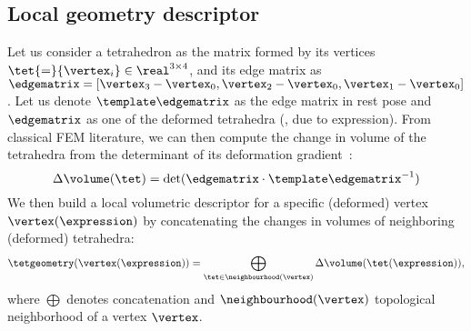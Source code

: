   \subsection{Local geometry descriptor}
    \label{sec:blendfields-similarity}
    Let us consider a tetrahedron as the matrix formed by its vertices~$\tet
    {=} \{\vertex_i\} \in \real^{3 \times 4}$, and its edge matrix as
    $\edgematrix = [\vertex_3-\vertex_0, \vertex_2-\vertex_0,
    \vertex_1-\vertex_0]$.
    Let us denote $\template\edgematrix$ as the edge matrix in rest pose and
    $\edgematrix$ as one of the deformed tetrahedra (\ie, due to expression).
    From classical FEM literature, we can then compute the change in volume of the tetrahedra from the determinant of its deformation gradient~\cite{irving2004invertible}:
    \begin{equation}
      \label{eq:blendfields-volume}
      \Delta \volume(\tet) = \text{det}(\edgematrix \cdot \template\edgematrix^{-1})
    \end{equation}
    We then build a local volumetric descriptor for a specific (deformed) vertex $\vertex(\expression)$ by concatenating the changes in volumes of neighboring (deformed) tetrahedra:
    \begin{align}
      \label{eq:blendfields-local-descriptor}
      \tetgeometry(\vertex(\expression)) =
      \bigoplus_{\tet \in \neighbourhood(\vertex)}
      \Delta \volume(\tet(\expression)),
    \end{align}
    where $\bigoplus$ denotes concatenation and $\neighbourhood(\vertex)$ topological neighborhood of a vertex $\vertex$.

    
    
